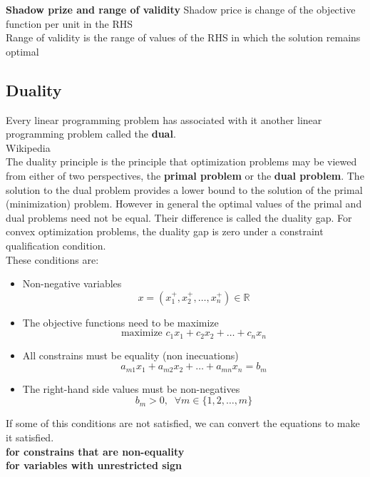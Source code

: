 \textbf{Shadow prize and range of validity}
Shadow price is change of the objective function per unit in the RHS\\
Range of validity is the range of values of the RHS in which the solution remains optimal

\subsection{Duality}
Every linear programming problem has associated with it another linear programming
problem called the \textbf{dual}.\\

Wikipedia\\
The duality principle is the principle that optimization problems may be viewed from either of two perspectives, the \textbf{primal problem} or the \textbf{dual problem}. 
The solution to the dual problem provides a lower bound to the solution of the primal (minimization) problem. However in general the optimal values of 
the primal and dual problems need not be equal. Their difference is called the duality gap. For convex optimization problems, the duality gap is zero under 
a constraint qualification condition. \\

These conditions are:
\begin{itemize}
    \item Non-negative variables
    \[x = (x_1^+, x_2^+, \dots , x_n^+) \in \mathbb{R}\]
    \item The objective functions need to be maximize
    \[ \text{maximize } c_1x_1 + c_2x_2 + \dots + c_nx_n\]
    \item All constrains must be equality (non inecuations)
    \[ a_{m1}x_1 + a_{m2}x_2 + \dots + a_{mn}x_n = b_m \]
    \item The right-hand side values must be non-negatives
    \[ b_m > 0,\;\; \forall m \in \{1,2,\dots,m\} \]
\end{itemize}

If some of this conditions are not satisfied, we can convert the equations to make it satisfied.\\
\textbf{for constrains that are non-equality}\\
\textbf{for variables with unrestricted sign}\\

